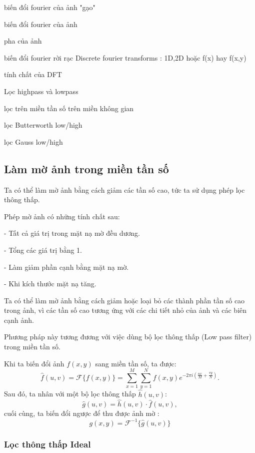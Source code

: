 \documentclass[12pt,a4paper]{report}
\numberwithin{equation}{section}
\theoremstyle{definition} %
\begin{document}
biến đổi fourier của ảnh "gạo"

biến đổi fourier của ảnh

pha của ảnh

biến đổi fourier rời rạc Discrete fourier transforms :  1D,2D hoặc f(x) hay f(x,y)

tính chất của DFT

Lọc highpass và lowpass

lọc trên miền tần số trên miền không gian

lọc Butterworth low/high

lọc Gauss low/high




\subsection{Làm mờ ảnh trong miền tần số}

Ta có thể làm mờ ảnh bằng cách giảm các tần số cao, tức ta sử dụng phép lọc thông thấp.

Phép mờ ảnh có những tính chất sau:

- Tất cả giá trị trong mặt nạ mờ đều dương.

- Tổng các giá trị bằng 1.

- Làm giảm phần cạnh bằng mặt nạ mờ.

- Khi kích thước mặt nạ tăng.

Ta có thể làm mờ ảnh bằng cách giảm hoặc loại bỏ các thành phần tần số cao trong ảnh, vì các tần số cao tương ứng với các chi tiết nhỏ của ảnh và các biên cạnh ảnh.

Phương pháp này tương đương với việc dùng bộ lọc thông thấp (Low pass filter) trong miền tần số.

Khi ta biến đổi ảnh $f(x,y)$ sang miền tần số, ta được: 
\begin{equation}
	\label{141}
	\hat{f}(u,v) = \mathcal{F}\{f(x,y)\} = \sum_{x=1}^{M}\sum_{y=1}^{N} f(x,y)e^{-2\pi i\left(\frac{ux}{M}+\frac{vy}{N}\right)}.
\end{equation}
Sau đó, ta nhân với một bộ lọc thông thấp $\hat{h}(u,v)$: 
\begin{equation}
\label{142}
\hat{g}(u,v) = \hat{h}(u,v)\cdot\hat{f}(u,v),
\end{equation}
cuối cùng, ta biến đổi ngược để thu được ảnh mờ : 
\begin{equation}
\label{143}
g(x,y) = \mathcal{F}^{-1}\{\hat{g}(u,v)\}
\end{equation}
\subsubsection{Lọc thông thấp Ideal}
\end{document}
